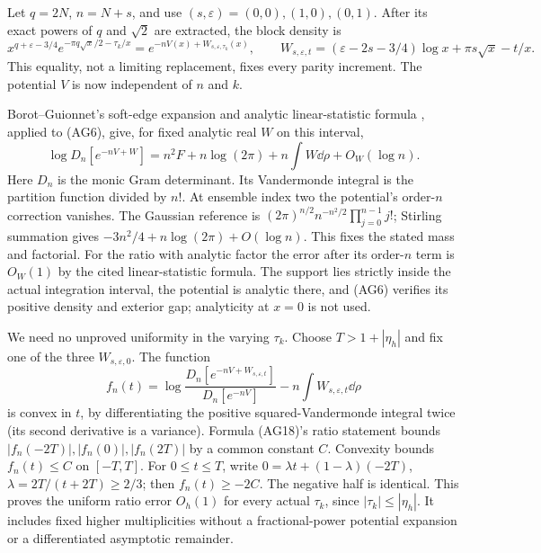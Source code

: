 Let $q=2N$, $n=N+s$, and use $(s,\varepsilon)=(0,0),(1,0),(0,1)$.
After its exact powers of $q$ and $\sqrt2$ are extracted, the block density is
\begin{equation}\tag{AG17}
 x^{q+\varepsilon-3/4}e^{-\pi q\sqrt x/2-\tau_k/x}
 =e^{-nV(x)+W_{s,\varepsilon,\tau_k}(x)},\qquad
 W_{s,\varepsilon,t}=(\varepsilon-2s-3/4)\log x+\pi s\sqrt x-t/x.
\end{equation}
This equality, not a limiting replacement, fixes every parity increment.
The potential $V$ is now independent of $n$ and $k$.

Borot--Guionnet's soft-edge expansion and analytic linear-statistic formula
\cite[Propositions 1.2 and 5.2, equations (1-3)--(1-6)]{a03ag:BG}, applied to
(AG6), give, for fixed analytic real $W$ on this interval,
\begin{equation}\tag{AG18}
 \log D_n[e^{-nV+W}]
 =n^2F+n\log(2\pi)+n\int W\dd\rho+O_W(\log n).
\end{equation}
Here $D_n$ is the monic Gram determinant. Its Vandermonde integral is the
partition function divided by $n!$. At ensemble index two the potential's
order-$n$ correction vanishes. The Gaussian reference is
$(2\pi)^{n/2}n^{-n^2/2}\prod_{j=0}^{n-1}j!$; Stirling summation gives
$-3n^2/4+n\log(2\pi)+O(\log n)$. This fixes the stated mass and factorial.
For the ratio with analytic factor the error after its order-$n$ term is
$O_W(1)$ by the cited linear-statistic formula. The support lies strictly
inside the actual integration interval, the potential is analytic there,
and (AG6) verifies its positive density and exterior gap; analyticity at
$x=0$ is not used.

We need no unproved uniformity in the varying $\tau_k$. Choose
$T>1+|\eta_h|$ and fix one of the three $W_{s,\varepsilon,0}$.
The function
\[
 f_n(t)=\log\frac{D_n[e^{-nV+W_{s,\varepsilon,t}}]}{D_n[e^{-nV}]}
                  -n\int W_{s,\varepsilon,t}\dd\rho
\]
is convex in $t$, by differentiating the positive squared-Vandermonde
integral twice (its second derivative is a variance).
Formula (AG18)'s ratio statement bounds $|f_n(-2T)|,|f_n(0)|,|f_n(2T)|$
by a common constant $C$. Convexity bounds $f_n(t)\le C$ on $[-T,T]$.
For $0\le t\le T$, write $0=\lambda t+(1-\lambda)(-2T)$,
$\lambda=2T/(t+2T)\ge2/3$; then $f_n(t)\ge-2C$.
The negative half is identical. This proves the uniform ratio error $O_h(1)$
for every actual $\tau_k$, since $|\tau_k|\le|\eta_h|$.
It includes fixed higher multiplicities without a fractional-power potential
expansion or a differentiated asymptotic remainder.

